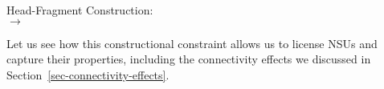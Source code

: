 {\ea
\label{hf-cx}
Head-Fragment Construction:\\
$\rightarrow$

\z
Let us see how this constructional constraint allows us to
license NSUs and capture their properties, including the connectivity effects we discussed in Section~\ref{sec-connectivity-effects}.

}

